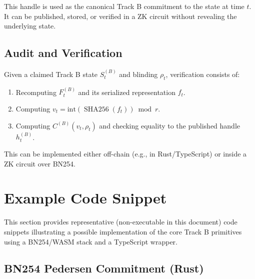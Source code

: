 \documentclass[11pt]{article}
\DeclareMathOperator{\SHA}{SHA256}
\begin{document}
This handle is used as the canonical Track B commitment to the state at time \(t\).
It can be published, stored, or verified in a ZK circuit without revealing the underlying state.

\subsection{Audit and Verification}

Given a claimed Track B state \(S_t^{(B)}\) and blinding \(\rho_t\), verification consists of:
\begin{enumerate}[leftmargin=1.5em]
  \item Recomputing \(F_t^{(B)}\) and its serialized representation \(f_t\).
  \item Computing \(v_t = \mathrm{int}(\SHA(f_t)) \bmod r\).
  \item Computing \(C^{(B)}(v_t,\rho_t)\) and checking equality to the published handle \(h_t^{(B)}\).
\end{enumerate}

This can be implemented either off-chain (e.g., in Rust/TypeScript) or inside a ZK circuit over BN254.

\section{Example Code Snippet}

This section provides representative (non-executable in this document) code snippets illustrating a possible implementation of the core Track B primitives using a BN254/WASM stack and a TypeScript wrapper.

\subsection{BN254 Pedersen Commitment (Rust)}
\end{document}
